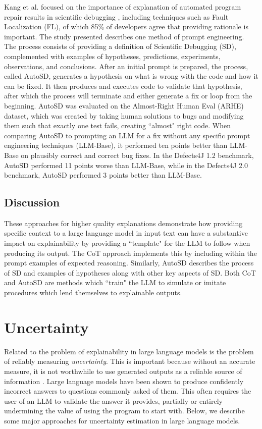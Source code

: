 \documentclass[letterpaper,12pt]{article}
\begin{document}
Kang et al. focused on the importance of explanation of automated program repair results in scientific debugging \cite{scidebug}, including techniques such as Fault Localization (FL), of which 85\% of developers agree that providing rationale is important. The study presented describes one method of prompt engineering. The process consists of providing a definition of Scientific Debugging (SD), complemented with examples of hypotheses, predictions, experiments, observations, and conclusions. After an initial prompt is prepared, the process, called AutoSD, generates a hypothesis on what is wrong with the code and how it can be fixed. It then produces and executes code to validate that hypothesis, after which the process will terminate and either generate a fix or loop from the beginning. AutoSD was evaluated on the Almost-Right Human Eval (ARHE) dataset, which was created by taking human solutions to bugs and modifying them such that exactly one test fails, creating ``almost" right code. When comparing AutoSD to prompting an LLM for a fix without any specific prompt engineering techniques (LLM-Base), it performed ten points better than LLM-Base on plausibly correct and correct bug fixes. In the Defects4J 1.2 benchmark, AutoSD performed 11 points worse than LLM-Base, while in the Defects4J 2.0 benchmark, AutoSD performed 3 points better than LLM-Base.

\subsection{Discussion}

These approaches for higher quality explanations demonstrate how providing specific context to a large language model in input text can have a substantive impact on explainability by providing a ``template" for the LLM to follow when producing its output. The CoT approach implements this by including within the prompt examples of expected reasoning. Similarly, AutoSD describes the process of SD and examples of hypotheses along with other key aspects of SD. Both CoT and AutoSD are methods which ``train" the LLM to simulate or imitate procedures which lend themselves to explainable outputs.

\section{Uncertainty}
Related to the problem of explainability in large language models is the problem of reliably measuring \emph{uncertainty}. This is important because without an accurate measure, it is not worthwhile to use generated outputs as a reliable source of information \cite{kuhn2023semantic}. Large language models have been shown to produce confidently incorrect answers to questions commonly asked of them. This often requires the user of an LLM to validate the answer it provides, partially or entirely undermining the value of using the program to start with. Below, we describe some major approaches for uncertainty estimation in large language models.
\end{document}
